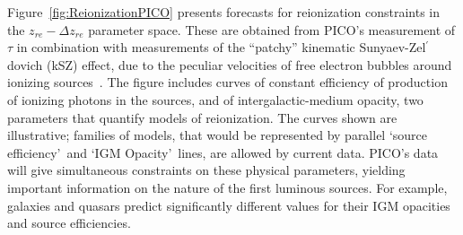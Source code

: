 \documentclass[PICOReport.tex]{subfiles}
\begin{document}

Figure~\ref{fig:ReionizationPICO} presents forecasts for reionization constraints in the $z_{re} - \Delta z_{re}$ parameter space. These are obtained from PICO's measurement of $\tau$ in combination with  measurements of the ``patchy'' kinematic Sunyaev-Zel$^{\prime}$dovich (kSZ) effect, due to the peculiar velocities of free electron bubbles around ionizing sources~\citep{Calabrese2014}.
The figure includes curves of constant efficiency of production of ionizing photons in the sources, and of intergalactic-medium opacity, two parameters that quantify models of reionization. The curves shown are illustrative; families of models, that would be represented by parallel \lq source efficiency\rq~and \lq IGM Opacity\rq~lines, are allowed by current data. PICO's data will give simultaneous constraints on these physical parameters, yielding important information on the nature of the first luminous sources. For example, galaxies and quasars predict significantly different values for their IGM opacities and source efficiencies.  
\end{document}

